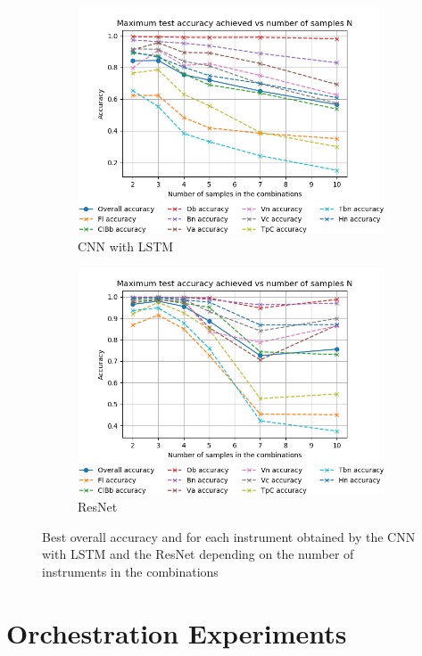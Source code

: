 \documentclass[runningheads,a4paper]{llncs}
\begin{document}
\begin{figure}
  \centering
  \begin{subfigure}{.52\textwidth}
    \centering
    \includegraphics[width=0.9\linewidth]{../ISMIR_2020/figs/Acc_vs_N_CNN.png}
    \caption{CNN with LSTM}
    \label{best_acc_cnn}
  \end{subfigure}%
  \begin{subfigure}{.52\textwidth}
    \centering
    \includegraphics[width=0.9\linewidth]{../ISMIR_2020/figs/Acc_vs_N_ResNet.png}
    \caption{ResNet}
    \label{best_acc_resnet}
  \end{subfigure}
  \caption{Best overall accuracy and for each instrument obtained by the CNN with LSTM and the ResNet depending on the number of instruments in the combinations}
  \end{figure}

\section{Orchestration Experiments}
\label{sec:orchestration}
\end{document}
